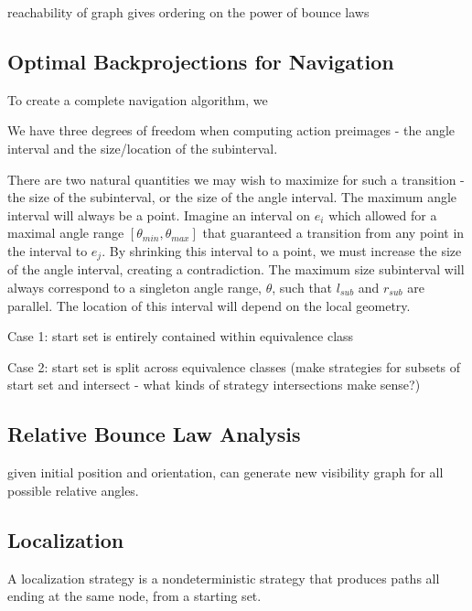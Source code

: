 \documentclass[]{styles/svproc}  %
\begin{document}
\begin{remark}
reachability of graph gives ordering on the power of bounce laws
\end{remark}

\subsection{Optimal Backprojections for Navigation}

To create a complete navigation algorithm, we 

We have three degrees of freedom when computing action preimages - the angle
interval and the size/location of the subinterval.

There are two natural quantities we may wish to maximize for such a transition -
the size of the subinterval, or the size of the angle interval.
The maximum angle interval will always be a point. Imagine an interval on $e_i$
which allowed for a maximal angle range $[\theta_{min}, \theta_{max}]$ that
guaranteed a transition from any point in the interval to $e_j$. By
shrinking this interval to a point, we must increase the size of the angle
interval, creating a contradiction. The maximum size subinterval will always correspond to a singleton angle range,
$\theta$, such that $l_{sub}$ and $r_{sub}$ are parallel. The location of this
interval will depend on the local geometry.

Case 1: start set is entirely contained within equivalence class

Case 2: start set is split across equivalence classes (make strategies for
subsets of start set and intersect - what kinds of strategy intersections make
sense?)

\subsection{Relative Bounce Law Analysis}

given initial position and orientation, can generate new visibility graph for
all possible relative angles.


\subsection{Localization}

\begin{definition}
A localization strategy is a nondeterministic strategy that produces paths all
ending at the same node, from a starting set.
\end{definition}
\end{document}

